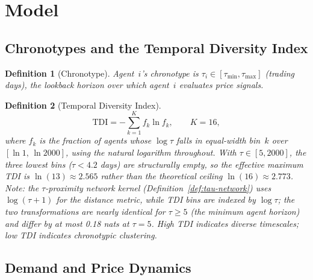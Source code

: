 \documentclass[preprint,12pt,authoryear]{elsarticle}
\newtheorem{definition}{Definition}
\begin{document}
\section{Model}
\label{sec:model}

\subsection{Chronotypes and the Temporal Diversity Index}

\begin{definition}[Chronotype]\label{def:chronotype}
Agent~$i$'s chronotype is $\tau_i \in [\tau_{\min}, \tau_{\max}]$
(trading days), the lookback horizon over which agent~$i$ evaluates
price signals.
\end{definition}

\begin{definition}[Temporal Diversity Index]\label{def:tdi}
\[
  \mathrm{TDI} = -\sum_{k=1}^{K} f_k \ln f_k, \qquad K = 16,
\]
where $f_k$ is the fraction of agents whose $\log\tau$ falls in
equal-width bin~$k$ over $[\ln 1,\,\ln 2000]$, using the natural
logarithm throughout.
With $\tau \in [5, 2000]$, the three lowest bins ($\tau < 4.2$ days) are
structurally empty, so the effective maximum TDI is $\ln(13) \approx 2.565$
rather than the theoretical ceiling $\ln(16) \approx 2.773$.
Note: the $\tau$-proximity network kernel
(Definition~\ref{def:tau-network}) uses $\log(\tau+1)$ for the distance metric, while TDI
bins are indexed by $\log\tau$; the two transformations are nearly
identical for $\tau \geq 5$ (the minimum agent horizon) and differ by at
most 0.18 nats at $\tau = 5$.
High TDI indicates diverse timescales; low TDI indicates chronotypic
clustering.
\end{definition}

\subsection{Demand and Price Dynamics}
\end{document}
